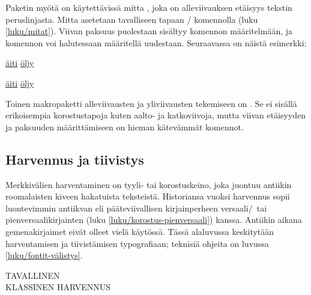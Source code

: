 \begin{koodilohkosis}
\usepackage[normalem]{ulem}
\end{koodilohkosis}

Paketin  myötä on käytettävissä mitta ,
joka on alleviivauksen etäisyys tekstin peruslinjasta. Mitta asetetaan
tavalliseen tapaan \-/ komennolla (luku
\ref{luku/mitat}). Viivan paksuus puolestaan sisältyy komennon
 määritelmään, ja komennon voi halutessaan
määritellä uudestaan. Seuraavassa on näistä esimerkki:

\begin{koodilohkosis}
\setlength{\ULdepth}{.2ex}        %
\renewcommand{\ULthickness}{.1ex} %
\uline{äiti} \uline{öljy}
\end{koodilohkosis}

\begin{tulossis}
  \setlength{\ULdepth}{.2ex}
  \renewcommand{\ULthickness}{.1ex}
  \uline{äiti} \uline{öljy}
\end{tulossis}

Toinen makropaketti alleviivausten ja yliviivausten tekemiseen on
. Se ei sisällä erikoisempia korostustapoja
kuten aalto- ja katkoviivoja, mutta viivan etäisyyden ja paksuuden
määrittämiseen on hieman kätevämmät komennot.

\subsection{Harvennus ja tiivistys}
\label{luku/korostus-harvennus}

Merkkivälien harventaminen on tyyli- tai korostuskeino, joka juontuu
antiikin roomalaisten kiveen hakatuista teksteistä. Historiansa vuoksi
harvennus sopii luontevimmin antiikvan eli pääteviivallisen
kirjainperheen versaali\-/\ tai pienversaalikirjainten (luku
\ref{luku/korostus-pienversaali}) kanssa. Antiikin aikana
gemenakirjaimet eivät olleet vielä käytössä. Tässä alaluvussa
keskitytään harventamisen ja tiivistämisen typografiaan; teknisiä
ohjeita on luvussa \ref{luku/fontit-välistys}.

\begin{koodilohkosis}
\large TAVALLINEN \\
{ KLASSINEN HARVENNUS}
\end{koodilohkosis}


